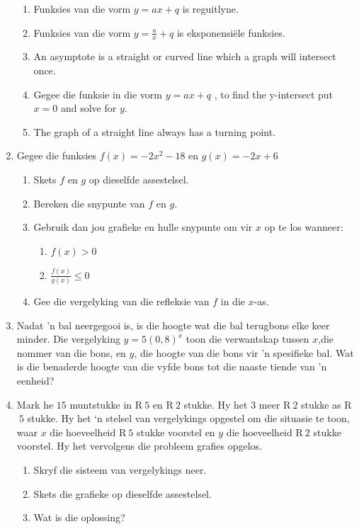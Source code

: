 \begin{eocexercises}{}
\begin{enumerate}[noitemsep, label=\textbf{\arabic*}. ]
\begin{enumerate}[noitemsep, label=\textbf{\alph*}. ]
    \item Funksies van die vorm $y=ax+q$ is reguitlyne.
    \item Funksies van die vorm $y=\frac{a}{x}+q$ is eksponensiële funksies.
    \item  An asymptote is a straight or curved line which a graph will intersect once.
    \item Gegee die funksie in die vorm $y=ax+q$ , to find the y-intersect put $x=0$ and solve for $y$.
    \item The graph of a straight line always has a turning point.
    \end{enumerate}
\item Gegee die funksies $f(x)=-2{x}^{2}-18$ en $g(x)=-2x+6$
    \begin{enumerate}[noitemsep, label=\textbf{\alph*}. ] 
    \item Skets $f$ en $g$ op dieselfde assestelsel.
    \item Bereken die snypunte van $f$ en $g$.
    \item Gebruik dan jou grafieke en hulle snypunte om vir $x$ op te los wanneer:
	\begin{enumerate}[noitemsep, label=\textbf{\roman*}. ] 
	\item $f(x)>0$
	\item $\frac{f(x)}{g(x)}\le 0$
	\end{enumerate}
    \item Gee die vergelyking van die refleksie van $f$ in die $x$-as.
    \end{enumerate}
\item Nadat ’n bal neergegooi is, is die hoogte wat die bal terugbons elke keer minder. Die vergelyking $y=5{(0,8)}^{x}$ toon die verwantskap tussen
 $x$,die nommer van die bons, en $y$, die hoogte van die bons vir ’n
spesifieke bal. Wat is die benaderde hoogte van die vyfde bons tot die naaste tiende van ’n eenheid?\newline
\item Mark he $15$ muntstukke in R$~5$ en R$~2$ stukke. Hy het $3$ meer R$~2$ stukke as R$~5$ stukke. Hy het ‘n stelsel
van vergelykings opgestel om die situasie te toon, waar $x$  die hoeveelheid R$~5$ stukke voorstel en $y$ die
hoeveelheid R$~2$ stukke voorstel. Hy het vervolgens die probleem grafies opgelos.
    \begin{enumerate}[noitemsep, label=\textbf{\alph*}. ] 
    \item Skryf die sisteem van vergelykings neer.
    \item Skets die grafieke op dieselfde assestelsel.
    \item Wat is die oplossing?
    \end{enumerate}


\end{enumerate}
\end{eocexercises}

